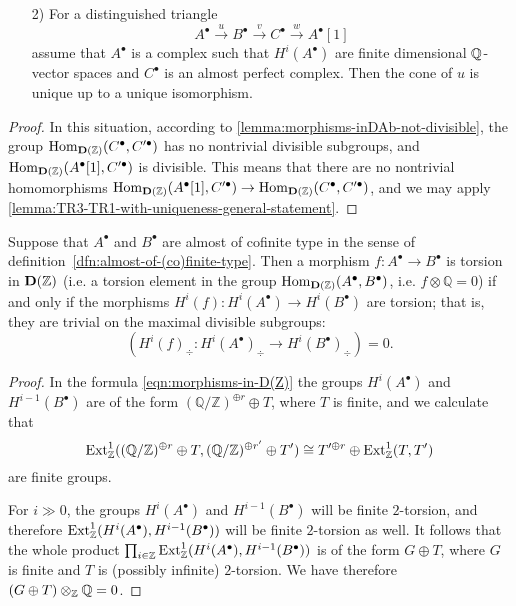 \documentclass{article}
\numberwithin{equation}{section}
\begin{document}
\begin{appendices}
\begin{corollary}
\begin{enumerate}
  \item[2)] For a distinguished triangle
    $$A^\bullet \xrightarrow{u} B^\bullet \xrightarrow{v} C^\bullet \xrightarrow{w} A^\bullet[1]$$
    assume that $A^\bullet$ is a complex such that $H^i (A^\bullet)$ are finite
    dimensional $\mathbb{Q}$-vector spaces and $C^\bullet$ is an almost perfect
    complex. Then the cone of $u$ is unique up to a unique isomorphism.
  \end{enumerate}

  \begin{proof}
    In this situation, according to \ref{lemma:morphisms-inDAb-not-divisible},
    the group $\operatorname{Hom}_{\mathbf{D} (\mathbb{Z})} (C^\bullet, C'^\bullet)$ has no
    nontrivial divisible subgroups, and
    $\operatorname{Hom}_{\mathbf{D} (\mathbb{Z})} (A^\bullet [1], C'^\bullet)$ is divisible. This
    means that there are no nontrivial homomorphisms
    $\operatorname{Hom}_{\mathbf{D} (\mathbb{Z})} (A^\bullet [1], C'^\bullet) \to \operatorname{Hom}_{\mathbf{D} (\mathbb{Z})} (C^\bullet, C'^\bullet)$,
    and we may apply \ref{lemma:TR3-TR1-with-uniqueness-general-statement}.
  \end{proof}
\end{corollary}

\begin{lemma}
  \label{lemma:torsion-morphisms-in-D(Z)}
  Suppose that $A^\bullet$ and $B^\bullet$ are almost of cofinite type in the
  sense of definition~\ref{dfn:almost-of-(co)finite-type}. Then a morphism
  $f\colon A^\bullet\to B^\bullet$ is torsion in $\mathbf{D} (\mathbb{Z})$
  (i.e. a torsion element in the group
  $\operatorname{Hom}_{\mathbf{D} (\mathbb{Z})} (A^\bullet, B^\bullet)$, i.e.
  $f\otimes \mathbb{Q} = 0$) if and only if the morphisms
  $H^i (f)\colon H^i (A^\bullet) \to H^i (B^\bullet)$
  are torsion; that is, they are trivial on the maximal divisible subgroups:
  $$(H^i (f)_\div\colon H^i (A^\bullet)_\div \to H^i (B^\bullet)_\div) = 0.$$

  \begin{proof}
    In the formula \eqref{eqn:morphisms-in-D(Z)} the groups $H^i (A^\bullet)$
    and $H^{i-1} (B^\bullet)$ are of the form
    $(\mathbb{Q}/\mathbb{Z})^{\oplus r} \oplus T$, where $T$ is finite, and we
    calculate that
    \[ \operatorname{Ext}_{\mathbb{Z}}^1 ((\mathbb{Q}/\mathbb{Z})^{\oplus r} \oplus T, (\mathbb{Q}/\mathbb{Z})^{\oplus r'} \oplus T') \cong
    T'^{\oplus r} \oplus \operatorname{Ext}_{\mathbb{Z}}^1 (T, T') \]
    are finite groups.

    For $i \gg 0$, the groups $H^i (A^\bullet)$ and $H^{i-1} (B^\bullet)$ will
    be finite $2$-torsion, and therefore
    $\operatorname{Ext}_{\mathbb{Z}}^1 (H^i (A^\bullet), H^{i-1} (B^\bullet))$ will be finite
    $2$-torsion as well. It follows that the whole product
    $\prod_{i\in \mathbb{Z}} \operatorname{Ext}_{\mathbb{Z}}^1 (H^i (A^\bullet), H^{i-1} (B^\bullet))$
    is of the form $G \oplus T$, where $G$ is finite and $T$ is
    (possibly infinite) $2$-torsion. We have therefore
    $(G \oplus T)\otimes_{\mathbb{Z}} \mathbb{Q} = 0$.


\end{proof}
\end{lemma}
\end{appendices}
\end{document}
